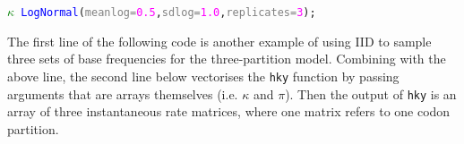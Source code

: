 \documentclass[10pt,letterpaper,table]{article}
\begin{document}
{\small
\begin{alltt}
    \textcolor{green}{\(\kappa\)} ~ \textcolor{blue}{LogNormal}(\textcolor{gray}{meanlog=}\textcolor{magenta}{0.5}, \textcolor{gray}{sdlog=}\textcolor{magenta}{1.0}, \textcolor{gray}{replicates=}\textcolor{magenta}{3});
\end{alltt}
}

The first line of the following code is another example of using IID to sample three sets of base frequencies for the three-partition model. 
Combining with the above line, the second line below vectorises the \texttt{hky} function by passing arguments that are arrays themselves (i.e. \texttt{$\kappa$} and \texttt{$\pi$}).
Then the output of \texttt{hky} is an array of three instantaneous rate matrices, where one matrix refers to one codon partition.
\end{document}
